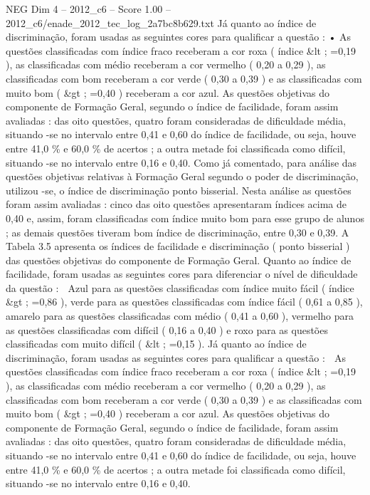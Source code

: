 \begin{textsample}{NEG Dim 4 – 2012\_c6 – Score 1.00 – 2012\_c6/enade\_2012\_tec\_log\_2a7bc8b629.txt}
Já quanto ao índice de discriminação, foram usadas as seguintes cores para qualificar a questão : • As questões classificadas com índice fraco receberam a cor roxa ( índice \&lt ; =0,19 ), as classificadas com médio receberam a cor vermelho ( 0,20 a 0,29 ), as classificadas com bom receberam a cor verde ( 0,30 a 0,39 ) e as classificadas com muito bom ( \&gt ; =0,40 ) receberam a cor azul.
As questões objetivas do componente de Formação Geral, segundo o índice de facilidade, foram assim avaliadas : das oito questões, quatro foram consideradas de dificuldade média, situando -se no intervalo entre 0,41 e 0,60 do índice de facilidade, ou seja, houve entre 41,0 \% e 60,0 \% de acertos ; a outra metade foi classificada como difícil, situando -se no intervalo entre 0,16 e 0,40.
Como já comentado, para análise das questões objetivas relativas à Formação Geral segundo o poder de discriminação, utilizou -se, o índice de discriminação ponto bisserial.
Nesta análise as questões foram assim avaliadas : cinco das oito questões apresentaram índices acima de 0,40 e, assim, foram classificadas com índice muito bom para esse grupo de alunos ; as demais questões tiveram bom índice de discriminação, entre 0,30 e 0,39.
A Tabela 3.5 apresenta os índices de facilidade e discriminação ( ponto bisserial ) das questões objetivas do componente de Formação Geral.
Quanto ao índice de facilidade, foram usadas as seguintes cores para diferenciar o nível de dificuldade da questão :  Azul para as questões classificadas com índice muito fácil ( índice \&gt ; =0,86 ), verde para as questões classificadas com índice fácil ( 0,61 a 0,85 ), amarelo para as questões classificadas com médio ( 0,41 a 0,60 ), vermelho para as questões classificadas com difícil ( 0,16 a 0,40 ) e roxo para as questões classificadas com muito difícil ( \&lt ; =0,15 ).
Já quanto ao índice de discriminação, foram usadas as seguintes cores para qualificar a questão :  As questões classificadas com índice fraco receberam a cor roxa ( índice \&lt ; =0,19 ), as classificadas com médio receberam a cor vermelho ( 0,20 a 0,29 ), as classificadas com bom receberam a cor verde ( 0,30 a 0,39 ) e as classificadas com muito bom ( \&gt ; =0,40 ) receberam a cor azul.
As questões objetivas do componente de Formação Geral, segundo o índice de facilidade, foram assim avaliadas : das oito questões, quatro foram consideradas de dificuldade média, situando -se no intervalo entre 0,41 e 0,60 do índice de facilidade, ou seja, houve entre 41,0 \% e 60,0 \% de acertos ; a outra metade foi classificada como difícil, situando -se no intervalo entre 0,16 e 0,40.

\end{textsample}
